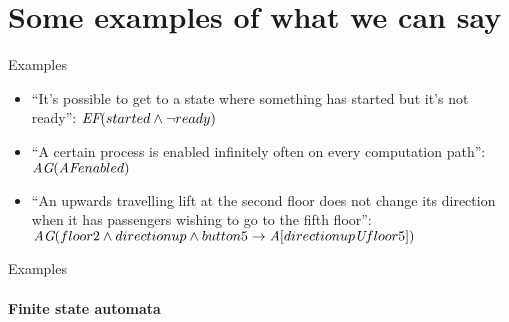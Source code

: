 \section{Some examples of what we can say}
\begin{frame}{Examples}
	\begin{itemize}
		\item 
		{
			``It's possible to get to a state where something has started but it's not ready'': $\textit{E}\textit{F}(started \land \neg ready)$ 
			\pause
		}
		\item
		{
			``A certain process is enabled infinitely often on every computation path'': $\textit{A}\textit{G}(\textit{A}\textit{F} enabled)$	
			\pause
		}
		\item
		{
			``An upwards travelling lift at the second floor does not change its direction when it has passengers wishing to go to the fifth floor'': $\textit{A}\textit{G}(floor2 \land directionup \land button5 \to \textit{A}[directionup \textit{U} floor5])$
		}
	\end{itemize}
\end{frame}

\begin{frame}{Examples}
    \framesubtitle{Finite state automata}
    \centering
\end{frame}


